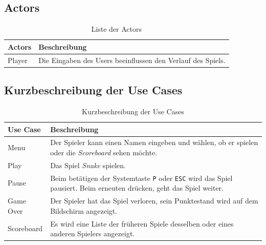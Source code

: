 \documentclass[a4paper, twosided, 11pt]{scrartcl}
\begin{document}
\subsection{Actors}
\begin{table}[H]
  \centering
  \begin{tabular}{ll}
    \toprule
    Actors & Beschreibung \\
    \midrule
    Player & Die Eingaben des Users beeinflussen den Verlauf des Spiels. \\
    \bottomrule
  \end{tabular}
  \caption{Liste der Actors}
\end{table}

\subsection{Kurzbeschreibung der Use Cases}
\begin{table}[H]
  \centering
  \begin{tabular}{lp{.75\linewidth}}
    \toprule
    Use Case & Beschreibung \\
    \midrule

    Menu & Der Spieler kann einen Namen eingeben und wählen, ob er spielen oder
    die \emph{Scoreboard} sehen möchte. \\

    Play & Das Spiel \emph{Snake} spielen. \\

    Pause & Beim betätigen der Systemtaste \texttt{P} oder \texttt{ESC} wird
    das Spiel pausiert. Beim erneuten drücken, geht das Spiel weiter. \\

    Game Over & Der Spieler hat das Spiel verloren, sein Punktestand wird auf
    dem Bildschirm angezeigt. \\

    Scoreboard & Es wird eine Liste der früheren Spiele desselben oder eines
    anderen Spielers angezeigt. \\

    \bottomrule
  \end{tabular}
  \caption{Kurzbeschreibung der Use Cases}
\end{table}
\end{document}
